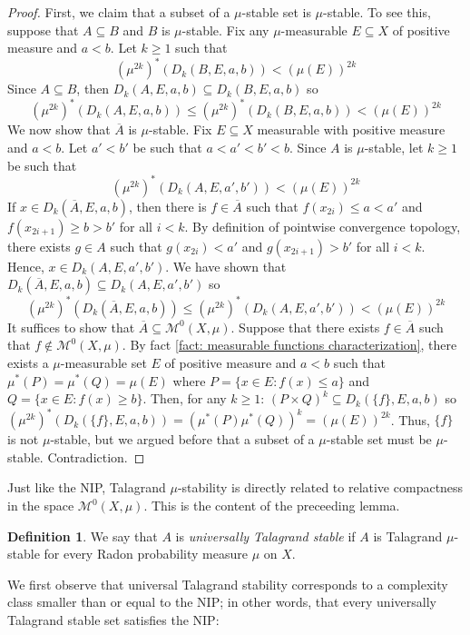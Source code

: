 \documentclass[psamsfonts]{amsart}
\theoremstyle{definition}
\newtheorem{defn}[thm]{Definition}
\theoremstyle{remark}
\numberwithin{equation}{section}
\begin{document}
\begin{proof}
    First, we claim that a subset of a $\mu$-stable set is $\mu$-stable.
    To see this, suppose that $A\subseteq B$ and $B$ is $\mu$-stable.
    Fix any $\mu$-measurable $E\subseteq X$ of positive measure and $a<b$.
    Let $k\geq 1$ such that
    \[
    (\mu^{2k})^*(D_k(B,E,a,b))<(\mu(E))^{2k}
    \]
    Since $A\subseteq B$, then $D_k(A,E,a,b)\subseteq D_k(B,E,a,b)$ so
    \[
    (\mu^{2k})^*(D_k(A,E,a,b))\leq (\mu^{2k})^*(D_k(B,E,a,b))<(\mu(E))^{2k}
    \]
    We now show that $\overline{A}$ is $\mu$-stable.
    Fix $E\subseteq X$ measurable with positive measure and $a<b$.
    Let $a'<b'$ be such that $a<a'<b'<b$.
    Since $A$ is $\mu$-stable, let $k\geq 1$ be such that
    \[
    (\mu^{2k})^*(D_k(A,E,a',b'))<(\mu(E))^{2k}
    \]
    If $x\in D_k(\overline{A},E,a,b)$, then there is $f\in\overline{A}$ such that $f(x_{2i})\leq a<a'$ and $f(x_{2i+1})\geq b>b'$ for all $i<k$.
    By definition of pointwise convergence topology, there exists $g\in A$ such that $g(x_{2i})<a'$ and $g(x_{2i+1})>b'$ for all $i<k$.
    Hence, $x\in D_k(A,E,a',b')$.
    We have shown that $D_k(\overline{A},E,a,b)\subseteq D_k(A,E,a',b')$ so
    \[
    (\mu^{2k})^*(D_k(\overline{A},E,a,b))\leq (\mu^{2k})^*(D_k(A,E,a',b'))<(\mu(E))^{2k}
    \]
    It suffices to show that $\overline{A}\subseteq \mathscr{M}^0(X,\mu)$.
    Suppose that there exists $f\in\overline{A}$ such that $f\notin \mathscr{M}^0(X,\mu)$.
    By fact \ref{fact: measurable functions characterization}, there exists a $\mu$-measurable set $E$ of positive measure and $a<b$ such that $\mu^*(P)=\mu^*(Q)=\mu(E)$ where $P=\{x\in E: f(x)\leq a\}$ and $Q=\{x\in E: f(x)\geq b\}$.
    Then, for any $k\geq 1$: $(P\times Q)^k\subseteq D_k(\{f\},E,a,b)$ so $(\mu^{2k})^*(D_k(\{f\},E,a,b))=(\mu^*(P)\mu^*(Q))^k=(\mu(E))^{2k}$.
    Thus, $\{f\}$ is not $\mu$-stable, but we argued before that a subset of a $\mu$-stable set must be $\mu$-stable.
    Contradiction.
\end{proof}

Just like the NIP, Talagrand $\mu$-stability is directly related to relative compactness in the space $\mathscr{M}^0(X,\mu)$.
This is the content of the preceeding lemma.

\begin{defn}
We say that $A$ is \emph{universally Talagrand stable} if $A$ is Talagrand $\mu$-stable for every Radon probability measure $\mu$ on $X$.
\end{defn}

We first observe  that universal Talagrand stability corresponds to a complexity class smaller than or equal to the NIP;
in other words, that every universally Talagrand stable set satisfies the NIP:
\end{document}

